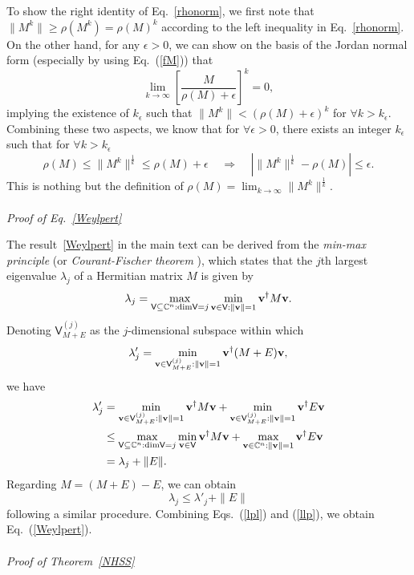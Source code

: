 \documentclass{tADP2e}
\theoremstyle{plain}
\theoremstyle{plain}
\theoremstyle{definition}
\begin{document}
\begin{appendices}
\vspace{3pt}
\noindent
To show the right identity of Eq.~\eqref{rhonorm}, we first note that $\|M^k\|\ge \rho(M^k)=\rho(M)^k$ according to the left inequality in Eq.~\eqref{rhonorm}. On the other hand, for any $\epsilon>0$, we can show on the basis of the Jordan normal form (especially by using Eq.~(\ref{fM})) that 
\begin{equation}
\lim_{k\to\infty} \left[\frac{M}{\rho(M)+\epsilon}\right]^k=0, 
\end{equation}
implying the existence of $k_\epsilon$ such that $\|M^k\|< (\rho(M)+\epsilon)^k$ for $\forall k>k_\epsilon$. Combining these two aspects, we know that for $\forall\epsilon>0$, there exists an integer $k_\epsilon$ such that for $\forall k>k_\epsilon$
\begin{equation}
\rho(M)\le\|M^k\|^{\frac{1}{k}}\le\rho(M)+\epsilon\;\;\;\;\Rightarrow\;\;\;\;
|\|M^k\|^{\frac{1}{k}}-\rho(M)|\le\epsilon.
\end{equation}
This is nothing but the definition of $\rho(M)=\lim_{k\to\infty}\|M^k\|^{\frac{1}{k}}$.
\\
\\
{\it Proof of Eq.~\eqref{Weylpert}}

\vspace{3pt}
\noindent
The result~\eqref{Weylpert} in the main text can  be derived from the \emph{min-max principle} (or \emph{Courant-Fischer theorem} \cite{CDM00}), which states that the $j$th largest eigenvalue $\lambda_j$ of a Hermitian matrix $M$ is given by
\begin{equation}
\lambda_j=\max_{\textsf{V}\subseteq\mathbb{C}^n:{\rm dim}\textsf{V}=j}\min_{\bold{v}\in \textsf{V}:\|\bold{v}\|=1}\bold{v}^\dag M\bold{v}.
\end{equation}
Denoting $\textsf{V}^{(j)}_{M+E}$ as the $j$-dimensional subspace within which 
\begin{equation}
\lambda'_j=\min_{\bold{v}\in \textsf{V}^{(j)}_{M+E}:\|\bold{v}\|=1}\bold{v}^\dag(M+E)\bold{v}, 
\end{equation}
we have
\begin{equation}
\begin{split}
\lambda'_j&=\min_{\bold{v}\in \textsf{V}^{(j)}_{M+E}:\|\bold{v}\|=1}\bold{v}^\dag M\bold{v}+\min_{\bold{v}\in \textsf{V}^{(j)}_{M+E}:\|\bold{v}\|=1}\bold{v}^\dag E\bold{v} \\
&\le \max_{\textsf{V}\subseteq\mathbb{C}^n:{\rm dim}\textsf{V}=j}\min_{\bold{v}\in \textsf{V}}\bold{v}^\dag M\bold{v}+\max_{\bold{v}\in \mathbb{C}^n:\|\bold{v}\|=1}\bold{v}^\dag E\bold{v} \\
&=\lambda_j+\|E\|.
\end{split}
\label{lpl}
\end{equation}
Regarding $M=(M+E)-E$, we can obtain 
\begin{equation}
\lambda_j\le\lambda'_j+\|E\| 
\label{llp}
\end{equation}
following a similar procedure. Combining Eqs.~(\ref{lpl}) and (\ref{llp}), we obtain  Eq.~(\ref{Weylpert}). 
\\
\\
{\it Proof of Theorem~\eqref{NHSS}}


\end{appendices}
\end{document}
